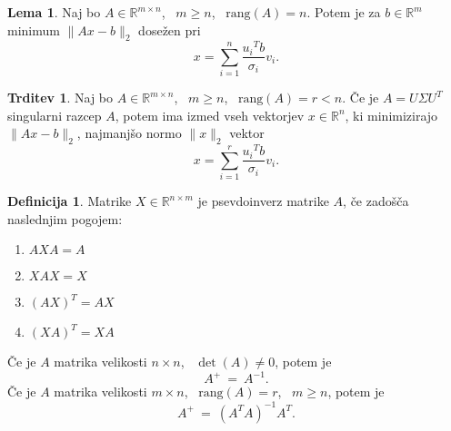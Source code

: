 \documentclass[11pt]{article}
\theoremstyle{definition}
\newtheorem{definicija}{Definicija}[section]
\newtheorem{lema}{Lema}
\newtheorem{trditev}{Trditev}
\begin{document}
\begin{lema}

Naj bo $A \in \mathbb{R}^{m \times n}$, ~$m \geq n$, ~$\text{rang}(A) = n$. Potem je za $b \in \mathbb{R}^m$ minimum $\|Ax - b\|_2$ dosežen pri 
$$x = \sum_{i=1}^n \frac{{u_i}^T b}{\sigma_i} v_i.$$
 
\end{lema}
\vspace{0.5cm}

\begin{trditev}

Naj bo $A \in \mathbb{R}^{m \times n}$, ~$m \geq n$, ~$\text{rang}(A) = r < n$. Če je $A = U \Sigma U^T$ singularni razcep $A$, potem ima izmed vseh vektorjev $x \in \mathbb{R}^n$, ki minimizirajo $\|Ax - b\|_2$, najmanjšo normo $\|x\|_2$ vektor
$$x = \sum_{i=1}^r \frac{{u_i}^T b}{\sigma_i} v_i.$$

\end{trditev}
\vspace{0.5cm}

\begin{definicija}

Matrike $X \in \mathbb{R}^{n \times m}$ je psevdoinverz matrike $A$, če zadošča naslednjim pogojem:
\begin{enumerate}
	\item $AXA = A$
	\item $XAX = X$
	\item $(AX)^T = AX$
	\item $(XA)^T = XA$
\end{enumerate} 
Če je $A$ matrika velikosti $n \times n$, ~$\det(A) \neq 0$, potem je
$$A^+ ~=~ A^{-1}.$$ 
Če je $A$ matrika velikosti $m \times n$, ~$\text{rang}(A) = r$, ~$m \geq n$, potem je  $$A^+ ~=~ (A^T A)^{-1} A^T.$$

\end{definicija}
\vspace{0.5cm}
\end{document}
